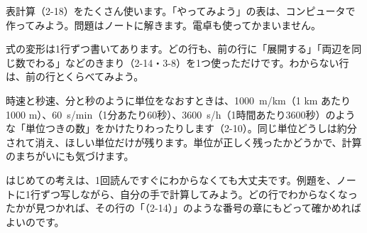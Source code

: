 
表計算（2-18）をたくさん使います。「やってみよう」の表は、コンピュータで作ってみよう。問題はノートに解きます。電卓も使ってかまいません。


式の変形は1行ずつ書いてあります。どの行も、前の行に「展開する」「両辺を同じ数でわる」などのきまり（2-14・3-8）を1つ使っただけです。わからない行は、前の行とくらべてみよう。


時速と秒速、分と秒のように単位をなおすときは、\qty{1000}{m/km}（1 km あたり 1000 m）、\qty{60}{s/min}（1分あたり60秒）、\qty{3600}{s/h}（1時間あたり3600秒）のような「単位つきの数」をかけたりわったりします（2-10）。同じ単位どうしは約分されて消え、ほしい単位だけが残ります。単位が正しく残ったかどうかで、計算のまちがいにも気づけます。


はじめての考えは、1回読んですぐにわからなくても大丈夫です。例題を、ノートに1行ずつ写しながら、自分の手で計算してみよう。どの行でわからなくなったかが見つかれば、その行の「（2-14）」のような番号の章にもどって確かめればよいのです。

